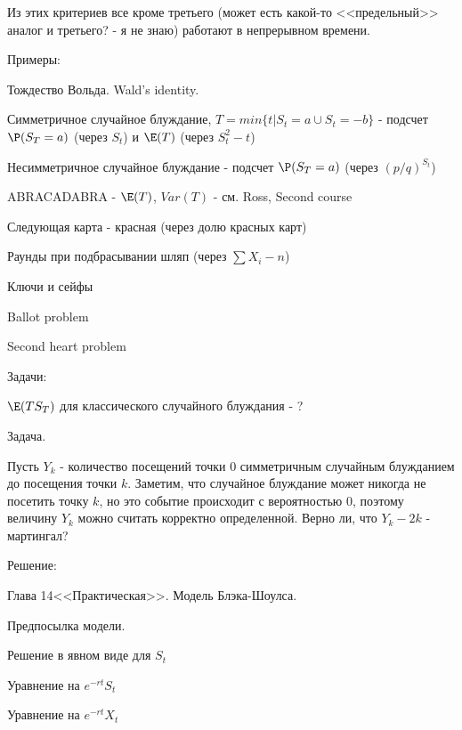 {Из этих критериев все кроме третьего (может есть какой-то <<предельный>> аналог и третьего? - я не знаю) работают в непрерывном времени.


Примеры:


Тождество Вольда. Wald's identity. 

Симметричное случайное блуждание, $T=min\{t|S_{t}=a\cup S_{t}=-b\}$ - подсчет $\P(S_{T}=a)$ (через $S_{t}$) и $\E(T)$ (через $S_{t}^{2}-t$) 

Несимметричное случайное блуждание - подсчет $\P(S_{T}=a)$ (через $(p/q)^{S_{t}}$)

ABRACADABRA - $\E(T)$, $Var(T)$ - см. Ross, Second course

Следующая карта - красная (через долю красных карт)

Раунды при подбрасывании шляп (через $\sum X_{i} -n$) %

Ключи и сейфы

Ballot problem %

Second heart problem %






Задачи: 


$\E(TS_{T})$ для классического случайного блуждания - ?





Задача.

Пусть $Y_{k}$ - количество посещений точки 0 симметричным случайным блужданием до посещения точки $k$. Заметим, что случайное блуждание может никогда не посетить точку $k$, но это событие происходит с вероятностью 0, поэтому величину $Y_{k}$ можно считать корректно определенной.
Верно ли, что $Y_{k}-2k$ - мартингал?

Решение:




Глава 14<<Практическая>>. Модель Блэка-Шоулса. \par

Предпосылка модели. \par
Решение в явном виде для $S_{t}$ \par

Уравнение на $e^{-rt}S_{t}$ \par
Уравнение на $e^{-rt}X_{t}$ \par

}
